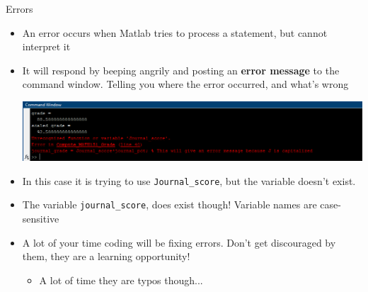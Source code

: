 {}\documentclass[letterpaper,
compress,
xcolor=x11names,
]{beamer}
\begin{document}
\begin{frame}{Errors}
	\footnotesize
	\begin{itemize}
		\item An error occurs when Matlab tries to process a statement, but cannot interpret it
		\item It will respond by beeping angrily and posting an \textbf{error message} to the command window. Telling you where the error occurred, and what's wrong
		\begin{center}
			\includegraphics[width = \linewidth]{error_message.png}
		\end{center}
		\item In this case it is trying to use \texttt{Journal\_score}, but the variable doesn't exist.
		\item The variable \texttt{journal\_score}, does exist though! Variable names are case-sensitive
		\item A lot of your time coding will be fixing errors. Don't get discouraged by them, they are a learning opportunity!
		\begin{itemize}
			\item A lot of time they are typos though...
		\end{itemize}
	\end{itemize}
\end{frame}
\end{document}
